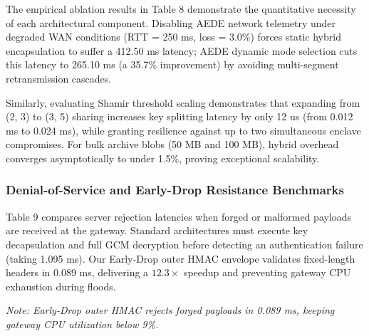 \documentclass[5p,times]{elsarticle}
\begin{document}
The empirical ablation results in Table 8 demonstrate the quantitative necessity of each architectural component. Disabling AEDE network telemetry under degraded WAN conditions (RTT = 250 ms, loss = 3.0\%) forces static hybrid encapsulation to suffer a 412.50 ms latency; AEDE dynamic mode selection cuts this latency to 265.10 ms (a 35.7\% improvement) by avoiding multi-segment retransmission cascades.

Similarly, evaluating Shamir threshold scaling demonstrates that expanding from (2, 3) to (3, 5) sharing increases key splitting latency by only 12 us (from 0.012 ms to 0.024 ms), while granting resilience against up to two simultaneous enclave compromises. For bulk archive blobs (50 MB and 100 MB), hybrid overhead converges asymptotically to under 1.5\%, proving exceptional scalability.


\subsubsection{Denial-of-Service and Early-Drop Resistance Benchmarks}

Table 9 compares server rejection latencies when forged or malformed payloads are received at the gateway. Standard architectures must execute key decapsulation and full GCM decryption before detecting an authentication failure (taking 1.095 ms). Our Early-Drop outer HMAC envelope validates fixed-length headers in 0.089 ms, delivering a $12.3\times$ speedup and preventing gateway CPU exhaustion during floods.

\begin{table}[!ht]
  \centering
  \caption{Denial-of-Service Early-Drop Rejection Latency and Speedup Dynamics}
  \vspace{2pt}
  \par\raggedright\footnotesize\textit{\textit{Note:} Early-Drop outer HMAC rejects forged payloads in 0.089 ms, keeping gateway CPU utilization below 9\%.}
\end{table}
\end{document}
